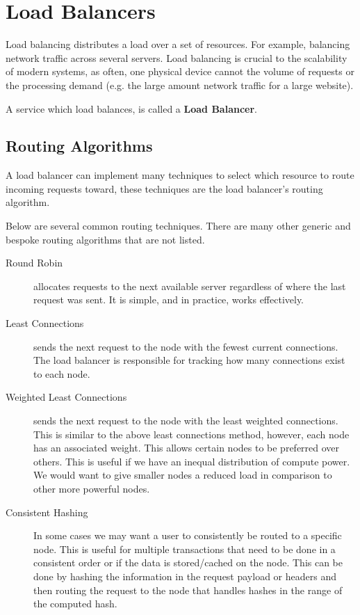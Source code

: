 \documentclass{csse4400}
\begin{document}
\section{Load Balancers}

Load balancing distributes a load over a set of resources.
For example, balancing network traffic across several servers.
Load balancing is crucial to the scalability of modern systems, as often,
one physical device cannot the volume of requests or the processing demand
(e.g. the large amount network traffic for a large website).

A service which load balances, is called a \textbf{Load Balancer}.


\subsection{Routing Algorithms}

A load balancer can implement many techniques to select which resource to route incoming requests toward,
these techniques are the load balancer's routing algorithm.

Below are several common routing techniques.
There are many other generic and bespoke routing algorithms that are not listed.

\begin{description}
  \item[Round Robin] allocates requests to the next available server regardless of where the last request was sent.
      It is simple, and in practice, works effectively.
  \item[Least Connections] sends the next request to the node with the fewest current connections.
      The load balancer is responsible for tracking how many connections exist to each node.
  \item[Weighted Least Connections] sends the next request to the node with the least weighted connections. This is similar to the above least connections method, however, each node has an associated weight.
      This allows certain nodes to be preferred over others.
      This is useful if we have an inequal distribution of compute power.
      We would want to give smaller nodes a reduced load in comparison to other more powerful nodes.
  \item[Consistent Hashing] In some cases we may want a user to consistently be routed to a specific node.
      This is useful for multiple transactions that need to be done in a consistent order or if the data is stored/cached on the node.
      This can be done by hashing the information in the request payload or headers and then routing the request to the node that handles hashes in the range of the computed hash.
\end{description}
\end{document}
